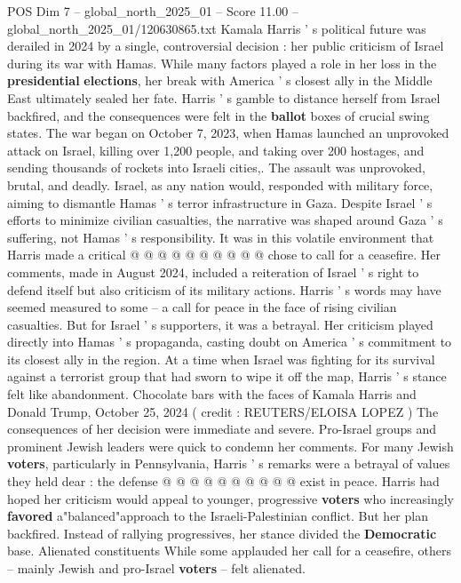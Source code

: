 \begin{textsample}{POS Dim 7 – global\_north\_2025\_01 – Score 11.00 – global\_north\_2025\_01/120630865.txt}  \label{ex:f7_pos_268}
Kamala Harris ' s political future was derailed in 2024 by a single, controversial decision : her public criticism of Israel during its war with Hamas.
While many factors played a role in her loss in the \textbf{presidential} \textbf{elections}, her break with America ' s closest ally in the Middle East ultimately sealed her fate.
Harris ' s gamble to distance herself from Israel backfired, and the consequences were felt in the \textbf{ballot} boxes of crucial swing states.
The war began on October 7, 2023, when Hamas launched an unprovoked attack on Israel, killing over 1,200 people, and taking over 200 hostages, and sending thousands of rockets into Israeli cities,.
The assault was unprovoked, brutal, and deadly.
Israel, as any nation would, responded with military force, aiming to dismantle Hamas ' s terror infrastructure in Gaza.
Despite Israel ' s efforts to minimize civilian casualties, the narrative was shaped around Gaza ' s suffering, not Hamas ' s responsibility.
It was in this volatile environment that Harris made a critical @ @ @ @ @ @ @ @ @ @ chose to call for a ceasefire.
Her comments, made in August 2024, included a reiteration of Israel ' s right to defend itself but also criticism of its military actions.
Harris ' s words may have seemed measured to some -- a call for peace in the face of rising civilian casualties.
But for Israel ' s supporters, it was a betrayal.
Her criticism played directly into Hamas ' s propaganda, casting doubt on America ' s commitment to its closest ally in the region.
At a time when Israel was fighting for its survival against a terrorist group that had sworn to wipe it off the map, Harris ' s stance felt like abandonment.
Chocolate bars with the faces of Kamala Harris and Donald Trump, October 25, 2024 ( credit : REUTERS/ELOISA LOPEZ ) The consequences of her decision were immediate and severe.
Pro-Israel groups and prominent Jewish leaders were quick to condemn her comments.
For many Jewish \textbf{voters}, particularly in Pennsylvania, Harris ' s remarks were a betrayal of values they held dear : the defense @ @ @ @ @ @ @ @ @ @ exist in peace.
Harris had hoped her criticism would appeal to younger, progressive \textbf{voters} who increasingly \textbf{favored} a"balanced"approach to the Israeli-Palestinian conflict.
But her plan backfired.
Instead of rallying progressives, her stance divided the \textbf{Democratic} base.
Alienated constituents While some applauded her call for a ceasefire, others -- mainly Jewish and pro-Israel \textbf{voters} -- felt alienated.

\end{textsample}
